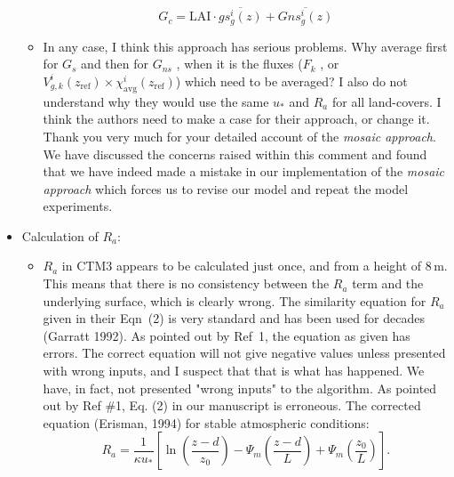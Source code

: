 \documentclass{scrartcl}
\begin{document}
\begin{itemize}
\begin{itemize}
\begin{equation}
      \label{eq:Gsto_corr}
      G_c = \mathrm{LAI} \cdot \overline{gs^i_g(z)} + \overline{Gns^i_g(z)}
    \end{equation}
  \item {\color{blue} In any case, I think this approach has serious problems. Why average first for $G_s$ and then for $G_{ns}$ , when it is the fluxes ($F_k$ , or $V^i_{g,k}(z_\mathrm{ref}) \times \chi^i_\mathrm{avg}(z_\mathrm{ref})$) which need to be averaged? I also do not understand why they would use the same $u_*$ and $R_a$ for all land-covers. I think the authors need to make a case for their approach, or change it.}
    Thank you very much for your detailed account of the \emph{mosaic approach}. We have discussed the concerns raised within this comment and found that we have indeed made a mistake in our implementation of the \emph{mosaic approach} which forces us to revise our model and repeat the model experiments.
  \end{itemize}
\item {\color{blue} Calculation of $R_a$:}
  \begin{itemize}
  \item {\color{blue} $R_a$ in CTM3 appears to be calculated just once, and from a height of 8\,m. This means
that there is no consistency between the $R_a$ term and the underlying surface, which is
clearly wrong. The similarity equation for $R_a$ given in their Eqn~(2) is very standard and has been
used for decades (Garratt 1992). As pointed out by Ref~1, the equation as given has
errors. The correct equation will not give negative values unless presented with wrong
inputs, and I suspect that that is what has happened.}
We have, in fact, not presented "wrong inputs" to the algorithm.
As pointed out by Ref \#1, Eq. (2) in our manuscript is erroneous. The corrected equation (Erisman, 1994) for stable atmospheric conditions:
\begin{equation}
  R_a = \frac{1}{\kappa u_*}\left[{\ln{\left(\frac{z-d}{z_0}\right)}-\Psi_m\left(\frac{z-d}{L}\right)+\Psi_m\left(\frac{z_0}{L}\right)}\right].
  \label{eq:aero_res}
\end{equation}



\end{itemize}
\end{itemize}
\end{document}
